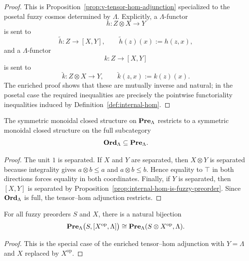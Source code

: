 \begin{proof}
    This is Proposition~\ref{prop:v-tensor-hom-adjunction} specialized to the posetal fuzzy cosmos determined by \(\Lambda\). Explicitly, a \(\Lambda\)-functor
    \[
        h:Z\otimes X\to Y
    \]
    is sent to
    \[
        \widetilde h:Z\to [X,Y],
        \qquad
        \widetilde h(z)(x):=h(z,x),
    \]
    and a \(\Lambda\)-functor
    \[
        k:Z\to [X,Y]
    \]
    is sent to
    \[
        \check k:Z\otimes X\to Y,
        \qquad
        \check k(z,x):=k(z)(x).
    \]
    The enriched proof shows that these are mutually inverse and natural; in the posetal case the required inequalities are precisely the pointwise functoriality inequalities induced by Definition~\ref{def:internal-hom}.
\end{proof}

\begin{corollary}
\label{cor:fuzzy-orders-monoidal-closed}
    The symmetric monoidal closed structure on \(\mathbf{Pre}_\Lambda\) restricts to a symmetric monoidal closed structure on the full subcategory
    \[
        \mathbf{Ord}_\Lambda\subseteq \mathbf{Pre}_\Lambda .
    \]
\end{corollary}

\begin{proof}
    The unit \(1\) is separated. If \(X\) and \(Y\) are separated, then \(X\otimes Y\) is separated because integrality gives \(a\otimes b\leq a\) and \(a\otimes b\leq b\). Hence equality to \(\top\) in both directions forces equality in both coordinates. Finally, if \(Y\) is separated, then \([X,Y]\) is separated by Proposition~\ref{prop:internal-hom-is-fuzzy-preorder}. Since \(\mathbf{Ord}_\Lambda\) is full, the tensor--hom adjunction restricts.
\end{proof}

\begin{corollary}
\label{cor:predicate-transposition}
    For all fuzzy preorders \(S\) and \(X\), there is a natural bijection
    \[
        \mathbf{Pre}_\Lambda\bigl(S,[X^{\mathrm{op}},\Lambda]\bigr)
        \cong
        \mathbf{Pre}_\Lambda(S\otimes X^{\mathrm{op}},\Lambda).
    \]
\end{corollary}

\begin{proof}
    This is the special case of the enriched tensor--hom adjunction \cite[Section~2.3, formula~(2.20)]{Kelly1982BasicConcepts} with \(Y=\Lambda\) and \(X\) replaced by \(X^{\mathrm{op}}\).
\end{proof}


